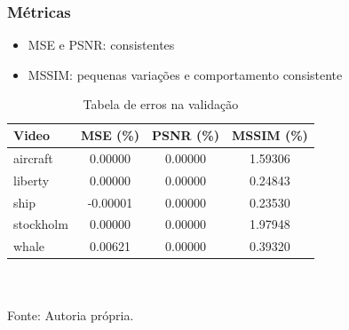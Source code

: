 	\begin{frame}\frametitle{Métricas}
		\begin{itemize}
			\item MSE e PSNR: consistentes
			\item MSSIM: pequenas variações e comportamento consistente
		\end{itemize}

		\begin{table}
			\tiny
			\caption{Tabela de erros na validação}
			\begin{tabular}{lccc}
			\hline
			Video & MSE (\%) & PSNR (\%) & MSSIM (\%) \\
			\hline
			aircraft & 0.00000 & 0.00000 & 1.59306 \\
			liberty  & 0.00000 & 0.00000 & 0.24843 \\
			ship     &-0.00001 & 0.00000 & 0.23530 \\
			stockholm &0.00000 & 0.00000 & 1.97948 \\
			whale    & 0.00621 & 0.00000 & 0.39320 \\
			\hline
			\end{tabular}
			\\ ~ \\
			\tiny
			Fonte: Autoria própria.
		\end{table}
    \end{frame}
